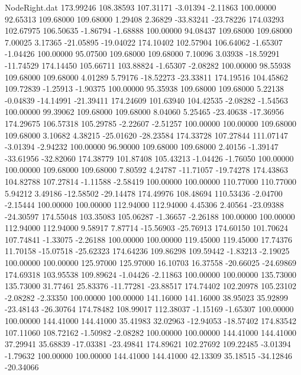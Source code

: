 \begin{filecontents}{NodeRight.dat}
 173.99246  108.38593  107.31171    -3.01394   -2.11863  100.00000   92.65313  109.68000  109.68000    1.29408    2.36829  -33.83241  -23.78226
 174.03293  102.67975  106.50635    -1.86794   -1.68888  100.00000   94.08437  109.68000  109.68000    7.00025    3.17365  -21.05895  -19.04022
 174.10402  102.57904  106.64062    -1.65307   -1.04426  100.00000   95.07500  109.68000  109.68000    7.10096    3.03938  -18.59291  -11.74529
 174.14450  105.66711  103.88824    -1.65307   -2.08282  100.00000   98.55938  109.68000  109.68000    4.01289    5.79176  -18.52273  -23.33811
 174.19516  104.45862  109.72839    -1.25913   -1.90375  100.00000   95.35938  109.68000  109.68000    5.22138   -0.04839  -14.14991  -21.39411
 174.24609  101.63940  104.42535    -2.08282   -1.54563  100.00000   99.39062  109.68000  109.68000    8.04060    5.25465  -23.40638  -17.36956
 174.29675  106.57318  105.29785    -2.22607   -2.51257  100.00000  100.00000  109.68000  109.68000    3.10682    4.38215  -25.01620  -28.23584
 174.33728  107.27844  111.07147    -3.01394   -2.94232  100.00000   96.90000  109.68000  109.68000    2.40156   -1.39147  -33.61956  -32.82060
 174.38779  101.87408  105.43213    -1.04426   -1.76050  100.00000  100.00000  109.68000  109.68000    7.80592    4.24787  -11.71057  -19.74278
 174.43863  104.82788  107.27814    -1.11588   -2.58419  100.00000  100.00000  110.77000  110.77000    5.94212    3.49186  -12.58502  -29.14478
 174.49976  108.48694  110.53436    -2.04700   -2.15444  100.00000  100.00000  112.94000  112.94000    4.45306    2.40564  -23.09388  -24.30597
 174.55048  103.35083  105.06287    -1.36657   -2.26188  100.00000  100.00000  112.94000  112.94000    9.58917    7.87714  -15.56903  -25.76913
 174.60150  101.70624  107.74841    -1.33075   -2.26188  100.00000  100.00000  119.45000  119.45000   17.74376   11.70158  -15.07518  -25.62323
 174.64236  109.86298  109.59442    -1.83213   -2.19025  100.00000  100.00000  125.97000  125.97000   16.10703   16.37558  -20.66025  -24.69869
 174.69318  103.95538  109.89624    -1.04426   -2.11863  100.00000  100.00000  135.73000  135.73000   31.77461   25.83376  -11.77281  -23.88517
 174.74402  102.20978  105.23102    -2.08282   -2.33350  100.00000  100.00000  141.16000  141.16000   38.95023   35.92899  -23.48143  -26.30764
 174.78482  108.99017  112.38037    -1.15169   -1.65307  100.00000  100.00000  144.41000  144.41000   35.41983   32.02963  -12.94053  -18.57402
 174.83542  107.11060  108.72162    -1.50982   -2.08282  100.00000  100.00000  144.41000  144.41000   37.29941   35.68839  -17.03381  -23.49841
 174.89621  102.27692  109.22485    -3.01394   -1.79632  100.00000  100.00000  144.41000  144.41000   42.13309   35.18515  -34.12846  -20.34066

\end{filecontents}
